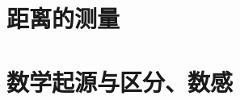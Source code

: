 \Topic{}
  \Teach{}

  \newtheorem*{Theorem}{定理}
  \makefront
\vspace{-1.5em}
\startexercise
\section{距离的测量}
  \section{数学起源与区分、数感}
